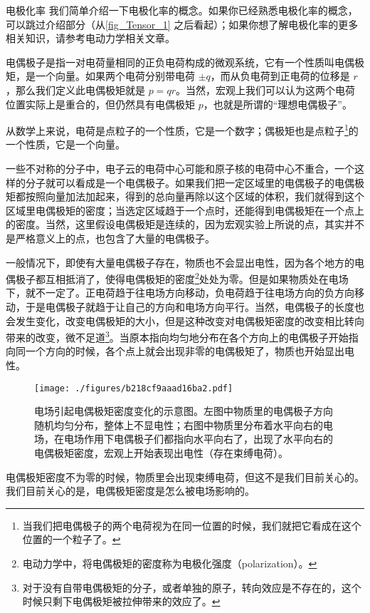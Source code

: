 \begin{example}{电极化率}
我们简单介绍一下电极化率的概念。如果你已经熟悉电极化率的概念，可以跳过介绍部分（从\autoref{fig_Tensor_1} 之后看起）；如果你想了解电极化率的更多相关知识，请参考电动力学相关文章。

电偶极子是指一对电荷量相同的正负电荷构成的微观系统，它有一个性质叫电偶极矩，是一个向量。如果两个电荷分别带电荷 $\pm q$，而从负电荷到正电荷的位移是 ${r}$，那么我们定义此电偶极矩就是 ${p}=q{r}$。当然，宏观上我们可以认为这两个电荷位置实际上是重合的，但仍然具有电偶极矩 ${p}$，也就是所谓的“理想电偶极子”。

从数学上来说，电荷是点粒子的一个性质，它是一个数字；偶极矩也是点粒子\footnote{当我们把电偶极子的两个电荷视为在同一位置的时候，我们就把它看成在这个位置的一个粒子了。}的一个性质，它是一个向量。

一些不对称的分子中，电子云的电荷中心可能和原子核的电荷中心不重合，一个这样的分子就可以看成是一个电偶极子。如果我们把一定区域里的电偶极子的电偶极矩都按照向量加法加起来，得到的总向量再除以这个区域的体积，我们就得到这个区域里电偶极矩的密度；当选定区域趋于一个点时，还能得到电偶极矩在一个点上的密度。当然，这里假设电偶极矩是连续的，因为宏观实验上所说的点，其实并不是严格意义上的点，也包含了大量的电偶极子。

一般情况下，即使有大量电偶极子存在，物质也不会显出电性，因为各个地方的电偶极子都互相抵消了，使得电偶极矩的密度\footnote{电动力学中，将电偶极矩的密度称为电极化强度（polarization）。}处处为零。但是如果物质处在电场下，就不一定了。正电荷趋于往电场方向移动，负电荷趋于往电场方向的负方向移动，于是电偶极子就趋于让自己的方向和电场方向平行。当然，电偶极子的长度也会发生变化，改变电偶极矩的大小，但是这种改变对电偶极矩密度的改变相比转向带来的改变，微不足道\footnote{对于没有自带电偶极矩的分子，或者单独的原子，转向效应是不存在的，这个时候只剩下电偶极矩被拉伸带来的效应了。}。当原本指向均匀地分布在各个方向上的电偶极子开始指向同一个方向的时候，各个点上就会出现非零的电偶极矩了，物质也开始显出电性。

\begin{figure}[ht]
\centering
\texttt{[image: ./figures/b218cf9aaad16ba2.pdf]}
\caption{电场引起电偶极矩密度变化的示意图。左图中物质里的电偶极子方向随机均匀分布，整体上不显电性；右图中物质里分布着水平向右的电场，在电场作用下电偶极子们都指向水平向右了，出现了水平向右的电偶极矩密度，宏观上开始表现出电性（存在束缚电荷）。} \label{fig_Tensor_1}
\end{figure}

电偶极矩密度不为零的时候，物质里会出现束缚电荷，但这不是我们目前关心的。我们目前关心的是，电偶极矩密度是怎么被电场影响的。


\end{example}

